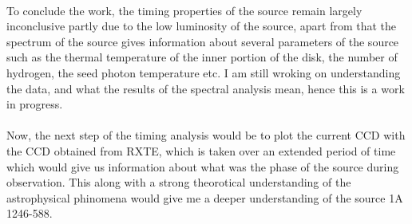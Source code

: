 \documentclass[a4paper,twoside]{report}
\numberwithin{equation}{section}
\begin{document}
\paragraph{}
To conclude the work, the timing properties of the source remain largely inconclusive partly due to the low luminosity of the source, apart from that the spectrum of the source gives information about several parameters of the source such as the thermal temperature of the inner portion of the disk, the number of hydrogen, the seed photon temperature etc. I am still wroking on understanding the data, and what the results of the spectral analysis mean, hence this is a work in progress. 
\paragraph{}
Now, the next step of the timing analysis would be to plot the current CCD with the CCD obtained from RXTE, which is taken over an extended period of time which would give us information about what was the phase of the source during observation. This along with a strong theorotical understanding of the astrophysical phinomena would give me a deeper understanding of the source 1A 1246-588. 
\end{document}
